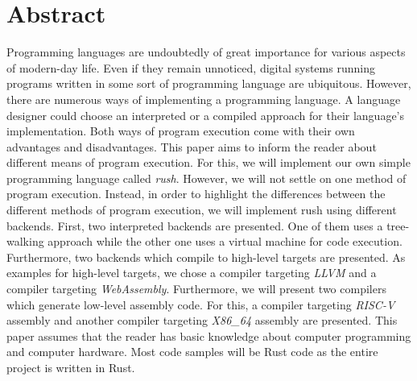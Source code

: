 \chapter*{Abstract}

Programming languages are undoubtedly of great importance for various aspects of
modern-day life. Even if they remain unnoticed, digital systems running programs
written in some sort of programming language are ubiquitous.
However, there are numerous ways of implementing a programming language. A
language designer could choose an interpreted or a compiled approach for their
language's implementation. Both ways of program execution come with their own
advantages and disadvantages.
\newline
This paper aims to inform the reader about different means of program execution.
For this, we will implement our own simple programming language called \emph{rush}.
However, we will not settle on one method of program execution. Instead, in
order to highlight the differences between the different methods of program
execution, we will implement rush using different backends.
First, two interpreted backends are presented. One of them uses a tree-walking
approach while the other one uses a virtual machine for code execution.
Furthermore, two backends which compile to high-level targets are presented. As
examples for high-level targets, we chose a compiler targeting \emph{LLVM} and a
compiler targeting \emph{WebAssembly}. Furthermore, we will present two compilers
which generate low-level assembly code. For this, a compiler targeting \emph{RISC-V}
assembly and another compiler targeting \emph{X86\_64} assembly are presented.
\newline
This paper assumes that the reader has basic knowledge about computer
programming and computer hardware. Most code samples will be Rust code as the
entire project is written in Rust.
